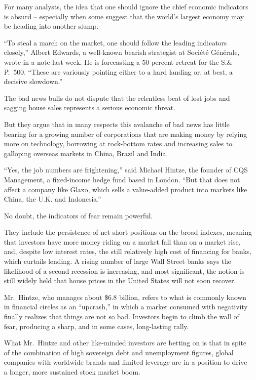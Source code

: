 ﻿\documentclass[12pt]{article}
\begin{document}
For many analysts, the idea that one should ignore the chief economic indicators is absurd --
especially when some suggest that the world's largest economy may be heading into another slump.

``To steal a march on the market, one should follow the leading indicators closely,'' Albert
Edwards, a well-known bearish strategist at Soci\'et\'e G\'en\'erale, wrote in a note last week. He
is forecasting a 50 percent retreat for the S.\& P.~500. ``These are variously pointing either to a
hard landing or, at best, a decisive slowdown.''

The bad news bulls do not dispute that the relentless beat of lost jobs and sagging house sales
represents a serious economic threat.

But they argue that in many respects this avalanche of bad news has little bearing for a growing
number of corporations that are making money by relying more on technology, borrowing at rock-bottom
rates and increasing sales to galloping overseas markets in China, Brazil and India.

``Yes, the job numbers are frightening,'' said Michael Hintze, the founder of CQS Management, a
fixed-income hedge fund based in London. ``But that does not affect a company like Glaxo, which
sells a value-added product into markets like China, the U.K. and Indonesia.''

No doubt, the indicators of fear remain powerful.

They include the persistence of net short positions on the broad indexes, meaning that investors
have more money riding on a market fall than on a market rise, and, despite low interest rates, the
still relatively high cost of financing for banks, which curtails lending. A rising number of large
Wall Street banks says the likelihood of a second recession is increasing, and most significant, the
notion is still widely held that house prices in the United States will not soon recover.

Mr.~Hintze, who manages about \$6.8 billion, refers to what is commonly known in financial circles
as an ``upcrash,'' in which a market consumed with negativity finally realizes that things are not
so bad. Investors begin to climb the wall of fear, producing a sharp, and in some cases,
long-lasting rally.

What Mr.~Hintze and other like-minded investors are betting on is that in spite of the combination
of high sovereign debt and unemployment figures, global companies with worldwide brands and limited
leverage are in a position to drive a longer, more sustained stock market boom.
\end{document}
